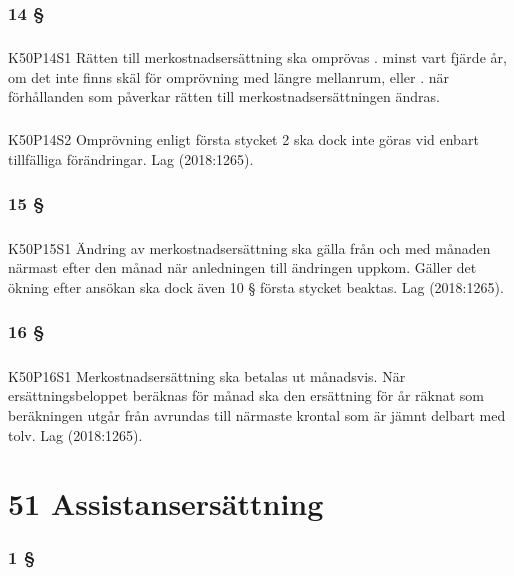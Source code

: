 \documentclass[a4paper,notitlepage,openany,10pt]{book}
\begin{document}
\subsection*{14 §}
\paragraph*{}
{\tiny K50P14S1}
Rätten till merkostnadsersättning ska omprövas
. minst vart fjärde år, om det inte finns skäl för omprövning med längre mellanrum, eller
. när förhållanden som påverkar rätten till merkostnadsersättningen ändras.
\paragraph*{}
{\tiny K50P14S2}
Omprövning enligt första stycket 2 ska dock inte göras vid enbart tillfälliga förändringar.
Lag (2018:1265).
\subsection*{15 §}
\paragraph*{}
{\tiny K50P15S1}
Ändring av merkostnadsersättning ska gälla från och med månaden närmast efter den månad när anledningen till ändringen uppkom. Gäller det ökning efter ansökan ska dock även 10 § första stycket beaktas.
Lag (2018:1265).
\subsection*{16 §}
\paragraph*{}
{\tiny K50P16S1}
Merkostnadsersättning ska betalas ut månadsvis. När ersättningsbeloppet beräknas för månad ska den ersättning för år räknat som beräkningen utgår från avrundas till närmaste krontal som är jämnt delbart med tolv.
Lag (2018:1265).
\chapter*{51 Assistansersättning}
\subsection*{1 §}
\end{document}
